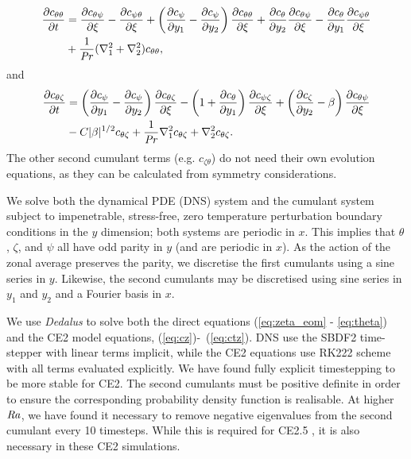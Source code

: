 \documentclass{jfm}
\newcommand{\cz}{c_{\zeta}}
\newcommand{\cs}{c_{\psi}}
\newcommand{\ct}{c_{\theta}}
\newcommand{\csz}{c_{\psi \zeta}}
\newcommand{\ctz}{c_{\theta \zeta}}
\newcommand{\czt}{c_{\zeta \theta}}
\newcommand{\ctt}{c_{\theta \theta}}
\newcommand{\cst}{c_{\psi \theta}}
\newcommand{\cts}{c_{\theta \psi}}
\newcommand{\Rayleigh}{\mbox{\textit{Ra}}}  %
\begin{document}
\begin{equation}
  \label{eq:ctt}
\begin{split}
  \pdv{\ctt}{t} &= \pdv{\cts}{\xi} - \pdv{\cst}{\xi} + \left(\pdv{\cs}{y_1} - \pdv{\cs}{y_2}\right)\pdv{\ctt}{\xi} + \pdv{\ct}{y_2}\pdv{\cts}{\xi} - \pdv{\ct}{y_1}\pdv{\cst}{\xi}\\
&  + \frac{1}{\Pran}(\nabla_1^2 + \nabla_2^2) \ctt,
\end{split}
\end{equation}
and
\begin{equation}
  \label{eq:ctz}
  \begin{split}
    \pdv{\ctz}{t} &= \left(\pdv{\cs}{y_1} - \pdv{\cs}{y_2}\right) \pdv{\ctz}{\xi} - \left(1 + \pdv{\ct}{y_1}\right) \pdv{\csz}{\xi} + \left(\pdv{\cz}{y_2} - \beta\right) \pdv{\cts}{\xi}\\
    &  - C |\beta|^{1/2} \ctz + \frac{1}{\Pran} \nabla_1^2 \ctz + \nabla_2^2 \ctz.
  \end{split}
\end{equation}
The other second cumulant terms (e.g. $\czt$) do not need their own evolution equations, as they can be calculated from symmetry considerations.

We solve both the dynamical PDE (DNS) system and the cumulant system subject to impenetrable, stress-free, zero temperature perturbation boundary conditions in the $y$ dimension; both systems are periodic in $x$. 
This implies that $\theta$, $\zeta$, and $\psi$ all have odd parity in $y$ (and are periodic in $x$). As
the action of the zonal average preserves the parity, we discretise the first cumulants using a sine series in $y$. Likewise,
the second cumulants may be discretised using sine series in $y_1$ and $y_2$ and a Fourier basis in $x$.

We use \emph{Dedalus} \citep{2020PhRvR...2b3068B} to solve both the direct equations (\ref{eq:zeta_eom} - \ref{eq:theta}) and the CE2 model equations, (\ref{eq:cz})-~(\ref{eq:ctz}).
DNS use the SBDF2 time-stepper with linear terms implicit, while
the CE2 equations use RK222 scheme with all terms evaluated explicitly.
We have found fully explicit timestepping to be more stable for CE2.
The second cumulants must be positive definite in order to ensure the corresponding probability density function is realisable.
At higher $\Rayleigh$, we have found it necessary to remove negative eigenvalues from the second cumulant every 10 timesteps.
While this is required for CE2.5 \citep{marston_qi_tobias_2019}, it is also necessary in these CE2 simulations.
\end{document}
